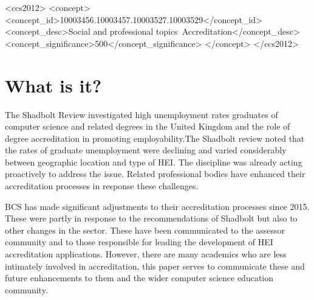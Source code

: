 \documentclass[sigconf]{acmart}
\begin{document}
\begin{CCSXML}
<ccs2012>
<concept>
<concept_id>10003456.10003457.10003527.10003529</concept_id>
<concept_desc>Social and professional topics~Accreditation</concept_desc>
<concept_significance>500</concept_significance>
</concept>
</ccs2012>
\end{CCSXML}




\maketitle


\section {What is it?}

The Shadbolt Review \cite{shadbolt2016shadbolt} investigated high unemployment rates graduates of computer science and related degrees in the United Kingdom and the role of degree accreditation in promoting employability.The Shadbolt review noted that the rates of graduate unemployment were declining and varied considerably between geographic location and type of HEI. The discipline was already acting proactively to address the issue.  Related professional bodies have enhanced their accreditation processes in response these challenges.

BCS has made significant adjustments to their accreditation processes since 2015. These were partly in response to the recommendations of Shadbolt but also to other changes in the sector.  These have been communicated to the assessor community and to those responsible for leading the development of HEI accreditation applications. However, there are many academics who are less intimately involved in accreditation, this paper serves to communicate these and future enhancements to them and the wider computer science education community.
\end{document}
